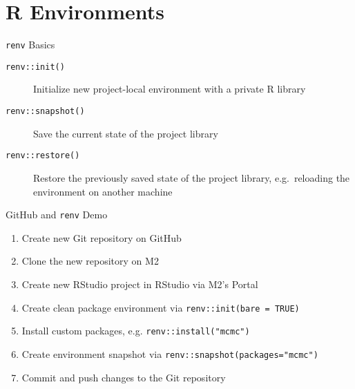 \section{R Environments}

\begin{frame}{\texttt{renv} Basics}
\begin{description}
\item[\texttt{renv::init()}] Initialize new project-local environment with a private R library
\item[\texttt{renv::snapshot()}] Save the current state of the project library
\item[\texttt{renv::restore()}] Restore the previously saved state of the project library, e.g.\ reloading the environment on another machine
\end{description}
\end{frame}

\begin{frame}{GitHub and \texttt{renv} Demo}
\begin{enumerate}
\item Create new Git repository on GitHub
\item Clone the new repository on M2
\item Create new RStudio project in RStudio via M2's Portal
\item Create clean package environment via \texttt{renv::init(bare = TRUE)}
\item Install custom packages, e.g. \texttt{renv::install("mcmc")}
\item Create environment snapshot via \texttt{renv::snapshot(packages="mcmc")}
\item Commit and push changes to the Git repository
\end{enumerate}
\end{frame}

